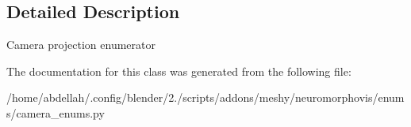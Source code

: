 \subsection{Detailed Description}


\begin{DoxyVerb}Camera projection enumerator
\end{DoxyVerb}
 

The documentation for this class was generated from the following file\+:\begin{DoxyCompactItemize}
\item 
/home/abdellah/.\+config/blender/2./scripts/addons/meshy/neuromorphovis/enums/camera\+\_\+enums.\+py\end{DoxyCompactItemize}
